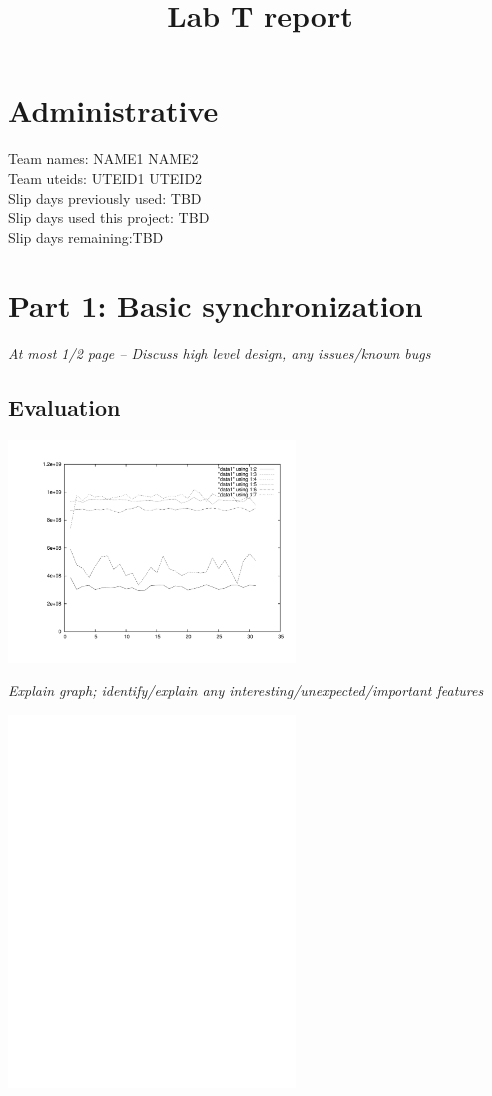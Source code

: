 \documentclass[11pt, letterpaper]{article}
\title{Lab T report}
\begin{document}
\maketitle
\section{Administrative}

Team names: NAME1 NAME2\\
Team uteids: UTEID1 UTEID2\\
Slip days previously used: TBD\\
Slip days used this project: TBD\\
Slip days remaining:TBD\\

\section{Part 1: Basic synchronization}

{\em At most 1/2 page -- Discuss high level design, any issues/known
  bugs}

\subsection{Evaluation}

\centerline{\includegraphics[width=3in]{plot1}}

{\em Explain graph; identify/explain any
  interesting/unexpected/important features}


\centerline{\includegraphics[width=3in]{plot1b}}
\end{document}
